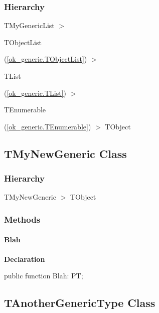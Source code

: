 \documentclass{report}
\begin{document}
\subsubsection*{\large{\textbf{Hierarchy}}\normalsize\hspace{1ex}\hfill}
TMyGenericList {$>$} \begin{ttfamily}TObjectList\end{ttfamily}(\ref{ok_generic.TObjectList}) {$>$} \begin{ttfamily}TList\end{ttfamily}(\ref{ok_generic.TList}) {$>$} \begin{ttfamily}TEnumerable\end{ttfamily}(\ref{ok_generic.TEnumerable}) {$>$} 
TObject
\subsection*{TMyNewGeneric Class}
\subsubsection*{\large{\textbf{Hierarchy}}\normalsize\hspace{1ex}\hfill}
TMyNewGeneric {$>$} TObject
\subsubsection*{\large{\textbf{Methods}}\normalsize\hspace{1ex}\hfill}
\paragraph*{Blah}\hspace*{\fill}

\begin{list}{}{
\setlength{\itemindent}{0cm}
\setlength{\listparindent}{0cm}
\setlength{\leftmargin}{\evensidemargin}
\addtolength{\leftmargin}{\tmplength}
\settowidth{\labelsep}{X}
\addtolength{\leftmargin}{\labelsep}
\setlength{\labelwidth}{\tmplength}
}
\begin{flushleft}
\item[\textbf{Declaration}\hfill]
\begin{ttfamily}
public function Blah: PT;\end{ttfamily}


\end{flushleft}
\end{list}
\subsection*{TAnotherGenericType Class}
\end{document}
